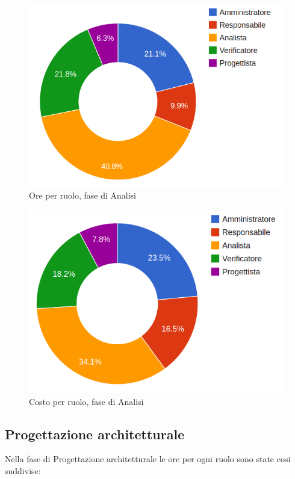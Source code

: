 \begin{figure}[H]
\centering
\includegraphics[scale=0.35]{5-1-1.png}
\caption{Ore per ruolo, fase di Analisi\label{fig:nome}}
\end{figure}

\begin{figure}[H]
\centering
\includegraphics[scale=0.35]{5-1-2.png}
\caption{Costo per ruolo, fase di Analisi\label{fig:nome}}
\end{figure}

\subsection{Progettazione architetturale}

Nella fase di Progettazione architetturale le ore per ogni ruolo sono state cosi suddivise:

